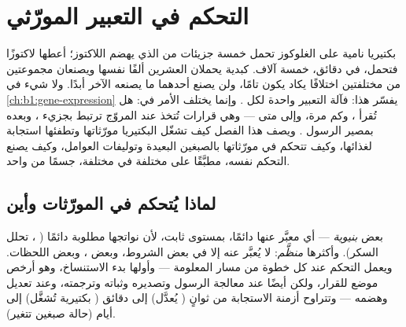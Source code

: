 \chapter{التحكم في التعبير المورّثي}\label{ch:b1:expression-control}

بكتيريا نامية على الغلوكوز تحمل خمسة جزيئات من  الذي يهضم
اللاكتوز؛ أعطها لاكتوزًا فتحمل، في دقائق، خمسة آلاف.  كبدية
 يحملان  العشرين ألفًا نفسها ويصنعان مجموعتين من
 مختلفتين اختلافًا يكاد يكون تامًا، ولن يصنع أحدهما ما
يصنعه الآخر أبدًا. ولا شيء في \cref{ch:b1:gene-expression} يفسّر
هذا: فآلة التعبير واحدة لكل . وإنما يختلف الأمر في: هل
تُقرأ ، وكم مرة، وإلى متى --- وهي قرارات تُتخذ عند المروّج
 ترتبط بجزيء ، وبعده بمصير الرسول . ويصف هذا الفصل
كيف تشغّل البكتيريا مورّثاتها وتطفئها استجابة لغذائها، وكيف تتحكم
 في مورّثاتها بالصبغين  البعيدة وتوليفات
العوامل، وكيف يصنع التحكم نفسه، مطبَّقًا على  مختلفة في 
مختلفة، جسمًا من  واحد.

\section{لماذا يُتحكم في المورّثات وأين}

\begin{proposition}\label{prop:b1:expression-control:levels}
بعض  \emph{بنيوية} --- أي معبَّر عنها دائمًا، بمستوى ثابت،
لأن نواتجها مطلوبة دائمًا ( ،  تحلل
السكر). وأكثرها \emph{منظَّم}: لا يُعبَّر عنه إلا في بعض الشروط،
وبعض ، وبعض اللحظات. ويعمل التحكم عند كل خطوة من مسار
المعلومة --- وأولها بدء الاستنساخ، وهو أرخص موضع للقرار، ولكن أيضًا
عند معالجة الرسول وتصديره وثباته وترجمته، وعند تعديل 
وهضمه --- وتتراوح أزمنة الاستجابة من ثوانٍ ( يُعدَّل) إلى
دقائق ( بكتيرية تُشغَّل) إلى أيام (حالة صبغين تتغير).
\end{proposition}


